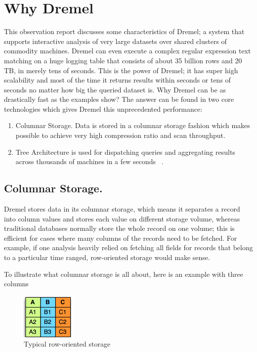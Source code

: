 \documentclass[9pt,twocolumn,twoside]{../../styles/osajnl}
\begin{document}
\section{Why Dremel}

This observation report discusses some characteristics of Dremel; a system that supports interactive analysis of very large datasets over shared clusters of commodity machines.  Dremel can even execute a complex regular expression text matching on a huge logging table that consists of about 35 billion rows and 20 TB, in merely tens of seconds. This is the power of Dremel; it has super high scalability and most of the time it returns results within seconds or tens of seconds no matter how big the queried dataset is.  Why Dremel can be as drastically fast as the examples show? The answer can be found in two core technologies which gives Dremel this unprecedented performance: 

\begin{enumerate}
  \item 	Columnar Storage. Data is stored in a columnar storage fashion which makes possible to achieve very high compression ratio and scan throughput.
  \item Tree Architecture is used for dispatching queries and aggregating results across thousands of machines in a few seconds ~\cite{paper-dremel}.
\end{enumerate}

\subsection{Columnar Storage.}
Dremel stores data in its columnar storage, which means it separates a record into column values and stores each value on different storage volume, whereas traditional databases normally store the whole record on one volume; this is efficient for cases where many columns of the records need to be fetched. For example, if one analysis heavily relied on fetching all fields for records that belong to a particular time ranged, row-oriented storage would make sense. 

To illustrate what columnar storage is all about, here is an example with three columns


\begin{figure}[H]
 \centering
\includegraphics[scale=0.7]{images/image1}
\caption{Typical row-oriented storage}
\end{figure}
\end{document}

